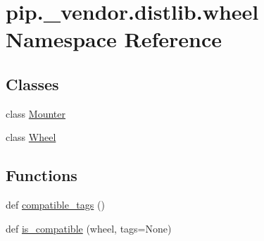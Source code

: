\hypertarget{namespacepip_1_1__vendor_1_1distlib_1_1wheel}{}\section{pip.\+\_\+vendor.\+distlib.\+wheel Namespace Reference}
\label{namespacepip_1_1__vendor_1_1distlib_1_1wheel}
\subsection*{Classes}
\begin{DoxyCompactItemize}
\item 
class \hyperlink{classpip_1_1__vendor_1_1distlib_1_1wheel_1_1Mounter}{Mounter}
\item 
class \hyperlink{classpip_1_1__vendor_1_1distlib_1_1wheel_1_1Wheel}{Wheel}
\end{DoxyCompactItemize}
\subsection*{Functions}
\begin{DoxyCompactItemize}
\item 
def \hyperlink{namespacepip_1_1__vendor_1_1distlib_1_1wheel_a70ee54953b1ad8e03574d7ea87fb46ef}{compatible\+\_\+tags} ()
\item 
def \hyperlink{namespacepip_1_1__vendor_1_1distlib_1_1wheel_aaf9347ce75a03786eb3c5f6c35dd8bbb}{is\+\_\+compatible} (wheel, tags=None)
\end{DoxyCompactItemize}
